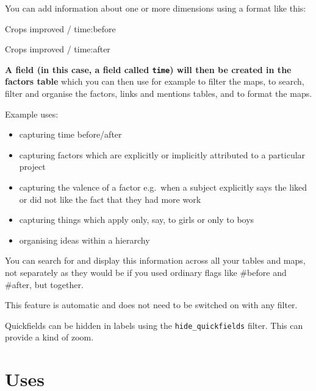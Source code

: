 \documentclass[
]{book}
\providecommand{\tightlist}{%
  \setlength{\itemsep}{0pt}\setlength{\parskip}{0pt}}
\begin{document}
You can add information about one or more dimensions using a format like this:

Crops improved / time:before

Crops improved / time:after

\textbf{A field (in this case, a field called \texttt{time}) will then be created in the factors table} which you can then use for example to filter the maps, to search, filter and organise the factors, links and mentions tables, and to format the maps.

Example uses:

\begin{itemize}
\tightlist
\item
  capturing time before/after
\item
  capturing factors which are explicitly or implicitly attributed to a particular project
\item
  capturing the valence of a factor e.g.~when a subject explicitly says the liked or did not like the fact that they had more work
\item
  capturing things which apply only, say, to girls or only to boys
\item
  organising ideas within a hierarchy
\end{itemize}

You can search for and display this information across all your tables and maps, not separately as they would be if you used ordinary flags like \#before and \#after, but together.

This feature is automatic and does not need to be switched on with any filter.

Quickfields can be hidden in labels using the \texttt{hide\_quickfields} filter. This can provide a kind of zoom.

\hypertarget{uses}{%
\section{Uses}\label{uses}}
\end{document}
